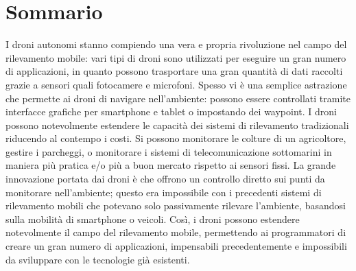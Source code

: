 \chapter*{Sommario}


I droni autonomi stanno compiendo una vera e propria rivoluzione nel campo del rilevamento mobile:
vari tipi di droni sono utilizzati per eseguire un gran numero di applicazioni, in quanto possono trasportare una gran quantità di dati raccolti grazie a sensori quali fotocamere e microfoni.
Spesso vi è una semplice astrazione che permette ai droni di navigare nell'ambiente: possono essere controllati tramite interfacce grafiche per smartphone e tablet o impostando dei waypoint.
I droni possono notevolmente estendere le capacità dei sistemi di rilevamento tradizionali riducendo al contempo i costi.
Si possono monitorare le colture di un agricoltore, gestire i parcheggi, o monitorare i sistemi di telecomunicazione sottomarini in maniera più pratica e/o più a buon mercato rispetto ai sensori fissi.
La grande innovazione portata dai droni è che offrono un controllo diretto sui punti da monitorare  nell'ambiente; questo era impossibile con i precedenti sistemi di rilevamento mobili che potevano solo passivamente rilevare l'ambiente, basandosi sulla mobilità di smartphone o veicoli.
Così, i droni possono estendere notevolmente il campo del rilevamento mobile, permettendo ai programmatori di creare un gran numero di applicazioni, impensabili precedentemente e impossibili da sviluppare con le tecnologie già esistenti.